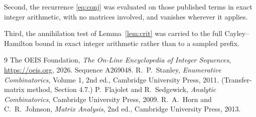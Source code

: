 \documentclass[11pt,a4paper]{article}
\theoremstyle{plain}
\theoremstyle{definition}
\begin{document}
Second, the recurrence \eqref{eq:conj} was evaluated on those published terms in exact
integer arithmetic, with no matrices involved, and vanishes wherever it applies.

Third, the annihilation test of Lemma~\ref{lem:crit} was carried to the full
Cayley--Hamilton bound in exact integer arithmetic rather than to a sampled prefix.

\begin{thebibliography}{9}
 The OEIS Foundation, \emph{The On-Line Encyclopedia of Integer
Sequences}, \url{https://oeis.org}, 2026. Sequence A269048.
 R.~P.~Stanley, \emph{Enumerative Combinatorics}, Volume 1, 2nd ed.,
Cambridge University Press, 2011. (Transfer-matrix method, Section 4.7.)
 P.~Flajolet and R.~Sedgewick, \emph{Analytic Combinatorics}, Cambridge
University Press, 2009.
 R.~A.~Horn and C.~R.~Johnson, \emph{Matrix Analysis}, 2nd ed., Cambridge
University Press, 2013.
\end{thebibliography}
\end{document}

